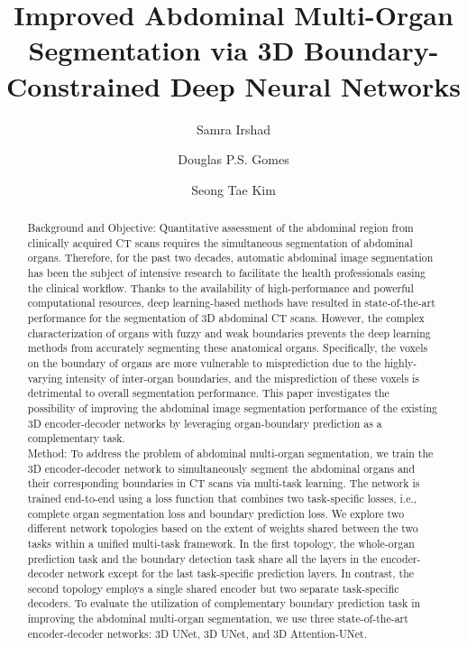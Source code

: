 \documentclass[final,5p,times,twocolumn]{elsarticle}
\begin{document}
\begin{frontmatter}

\title{Improved Abdominal Multi-Organ Segmentation via 3D Boundary-Constrained Deep Neural Networks}

\author[a]{Samra Irshad}
\author[b]{Douglas P.S. Gomes}
\author[c]{Seong Tae Kim}
\address[a]{Swinburne University of Technology, Hawthorn, Australia}
\address[b]{Victoria University, Melbourne, Australia}
\address[c]{Kyung Hee University, Yongin-si, Gyeonggi-do, South Korea}
\begin{abstract}
Background and Objective: Quantitative assessment of the abdominal region from clinically acquired CT scans requires the simultaneous segmentation of abdominal organs. Therefore, for the past two decades, automatic abdominal image segmentation has been the subject of intensive research to facilitate the health professionals easing the clinical workflow. Thanks to the availability of high-performance and powerful computational resources, deep learning-based methods have resulted in state-of-the-art performance for the segmentation of 3D abdominal CT scans. However, the complex characterization of organs with fuzzy and weak boundaries prevents the deep learning methods from accurately segmenting these anatomical organs. Specifically, the voxels on the boundary of organs are more vulnerable to misprediction due to the highly-varying intensity of inter-organ boundaries, and the misprediction of these voxels is detrimental to overall segmentation performance. This paper investigates the possibility of improving the abdominal image segmentation performance of the existing 3D encoder-decoder networks by leveraging organ-boundary prediction as a complementary task.\\

Method: To address the problem of abdominal multi-organ segmentation, we train the 3D encoder-decoder network to simultaneously segment the abdominal organs and their corresponding boundaries in CT scans via multi-task learning. The network is trained end-to-end using a loss function that combines two task-specific losses, i.e., complete organ segmentation loss and boundary prediction loss. We explore two different network topologies based on the extent of weights shared between the two tasks within a unified multi-task framework. In the first topology, the whole-organ prediction task and the boundary detection task share all the layers in the encoder-decoder network except for the last task-specific prediction layers. In contrast, the second topology employs a single shared encoder but two separate task-specific decoders. To evaluate the utilization of complementary boundary prediction task in improving the abdominal multi-organ segmentation, we use three state-of-the-art encoder-decoder networks: 3D UNet, 3D UNet, and 3D Attention-UNet. \\


\end{abstract}
\end{frontmatter}
\end{document}
